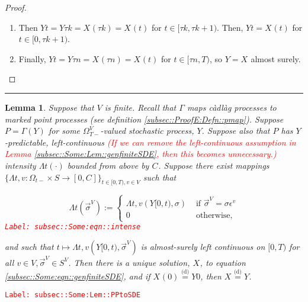 \documentclass[12pt]{article}
\newcommand{\ra}{\rightarrow}
\newcommand{\te}{\text}
\newcommand{\ep}{\epsilon}
\newcommand{\tr}{\textcolor{red}}
\newcommand{\labe}[1]{\tr{\texttt{Label: #1}}}
\newcommand{\lin}{\rule{\linewidth}{0.4 pt}}
\newcommand{\deq}{\overset{\text{(d)}}{=}}			%
\renewcommand{\v}{v}							%
\renewcommand{\S}{S}							%
\newcommand{\s}{\sigma}							%
\newcommand{\sv}{\vec{\s}}						%
\newcommand{\ev}{\ep}							%
\newcommand{\T}{T}								%
\renewcommand{\t}{t}							%
\newcommand{\sset}{\Omega}						%
\newcommand{\X}{X}								%
\newcommand{\vind}[1]{^{#1}}					%
\newcommand{\carp}[1]{^{#1}}					%
\newcommand{\vsi}[1]{^{#1}}						%
\newcommand{\cind}[1]{_{#1}}					%
\newcommand{\tp}[1]{(#1)}						%
\newcommand{\tip}[1]{#1}						%
\newcommand{\ts}[1]{_{#1}}						%
\newcommand{\const}{C}							%
\newcommand{\indx}[1]{_{#1}}					%
\newcommand{\XX}{Y}								%
\newcommand{\rt}{\tau}							%
\renewcommand{\it}{k}							%
\newcommand{\pmap}{\Gamma}						%
\newcommand{\rp}{P}								%
\newcommand{\ratee}{\Lambda}					%
\newtheorem{lem}[thms]{Lemma}
\begin{document}
\begin{proof}
\begin{enumerate}
\item Then \(\XX{}{\t} = \XX{}{\rt{\it}} = \X\cind{}\tp{\rt{\it}} = \X\cind{}\tp{\t}\) for \(\t \in [\rt{\it},\rt{\it+1})\). Then, \(\XX{}{\t} = \X\cind{}\tp{\t}\) for \(\t\in [0,\rt{\it+1})\).

\item Finally, \(\XX{}{\t} = \XX{}{\rt{n}} = \X\cind{}\tp{\rt{n}} = \X\cind{}\tp{\t}\) for \(\t\in [\rt{n},\T)\), so \(\XX{}{} = \X\cind{}\tip{}\) almost surely.
\end{enumerate}
\end{proof}

\lin

\begin{lem}
Suppose that \(V\) is finite. Recall that \(\pmap{}\) maps c\`adl\`ag processes to marked point processes (see definition \ref{subsec::ProofE:Defn::pmap}). Suppose \(\rp{} = \pmap{}(\XX{}{})\) for some \(\sset\vsi{V}\ts{\T-}\)-valued stochastic process, \(\XX{}{}\). Suppose also that \(\rp{}\) has \(\XX{}{}\)-predictable, left-continuous \tr{(If we can remove the left-continuous assumption in Lemma \ref{subsec::Some:Lem::genfiniteSDE}, then this becomes unnecessary.)} intensity \(\ratee{\t}(\cdot)\) bounded from above by \(\const\indx{}\). Suppose there exist mappings \(\{\ratee{\t,\v}:\sset\vsi{}\ts{\t-}\times \S \ra [0,\const\indx{}]\}_{\t\in[0,\T),\v\in V}\) such that 

\begin{equation}
\ratee{\t}(\sv\cind{}\vsi{V}) := \begin{cases}
\ratee{\t,\v}(\XX{}{[0,\t)},\s) &\te{ if } \sv\cind{}\vsi{V} = \s\ev\vind{\v}\\
0 &\te{ otherwise,}
\end{cases}
\label{subsec::Some:eqn::intense}
\end{equation}
\labe{subsec::Some:eqn::intense}

and such that \(\t\mapsto \ratee{\t,\v}(\XX{}{[0,\t)},\sv\cind{}\vsi{V})\) is almost-surely left continuous on \([0,\T)\) for all \(\v\in V,\sv\cind{}\vsi{V}\in \S\carp{V}\). Then there is a unique solution, \(\X\cind{}\tip{}\), to equation \eqref{subsec::Some:eqn::genfiniteSDE}, and if \(\X\cind{}\tp{0} \deq \XX{}{0}\), then \(\X\cind{}\tip{} \deq \XX{}{}\).

\label{subsec::Some:Lem::PPtoSDE}
\end{lem}
\labe{subsec::Some:Lem::PPtoSDE}
\end{document}
